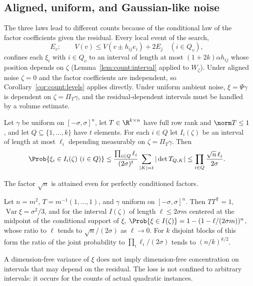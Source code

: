 \subsection{Aligned, uniform, and Gaussian-like noise}\label{sec:qp:ambient}

The three laws lead to different counts because of the conditional law of
the factor coefficients given the residual. Every local event of the search,
\[
 E_v:\qquad V(v)\le V(v\pm h_{ij}e_i)+2E_j\quad(i\in Q_v),
\]
confines each $\xi_i$ with $i\in Q_v$ to an interval of length at most
$(1+2k)\alpha h_{ij}$ whose position depends on $\zeta$
(Lemma~\ref{lem:count:interval} applied to $W_\zeta$). Under aligned noise
$\zeta=0$ and the factor coefficients are independent, so
Corollary~\ref{cor:count:levels} applies directly. Under uniform ambient
noise, $\xi=\Psi\gamma$ is dependent on $\zeta=\Pi_T\gamma$, and the
residual-dependent intervals must be handled by a volume estimate.

\begin{lemma}\label{lem:qp:volume}
Let $\gamma$ be uniform on $[-\sigma,\sigma]^n$, let $T\in\R^{k\times n}$ have
full row rank and $\norm T\le1$, and let $Q\subseteq\{1,\dots,k\}$ have $t$
elements. For each $i\in Q$ let $I_i(\zeta)$ be an interval of length at most
$\ell_i$ depending measurably on $\zeta=\Pi_T\gamma$. Then
\[
 \Prob\{\xi_i\in I_i(\zeta)\ (i\in Q)\}
 \le\frac{\prod_{i\in Q}\ell_i}{(2\sigma)^t}\sum_{|K|=t}|\det T_{Q,K}|
 \le\prod_{i\in Q}\frac{\sqrt n\,\ell_i}{2\sigma}.
\]
\end{lemma}

The factor $\sqrt n$ is attained even for perfectly conditioned factors.

\begin{proposition}\label{prop:qp:fiber-sharp}
Let $n=m^2$, $T=m^{-1}(1,\dots,1)$, and $\gamma$ uniform on
$[-\sigma,\sigma]^n$. Then $TT^{\mathsf T}=1$, $\operatorname{Var}\xi=\sigma^2/3$,
and for the interval $I(\zeta)$ of length $\ell\le2\sigma m$ centered at the
midpoint of the conditional support of $\xi$,
$\Prob\{\xi\in I(\zeta)\}=1-(1-\ell/(2\sigma m))^n$, whose ratio to $\ell$
tends to $\sqrt n/(2\sigma)$ as $\ell\to0$. For $k$ disjoint blocks of this
form the ratio of the joint probability to $\prod_i\ell_i/(2\sigma)$ tends
to $(n/k)^{k/2}$.
\end{proposition}

A dimension-free variance of $\xi$ does not imply dimension-free
concentration on intervals that may depend on the residual. The loss is not
confined to arbitrary intervals: it occurs for the counts of actual quadratic
instances.

